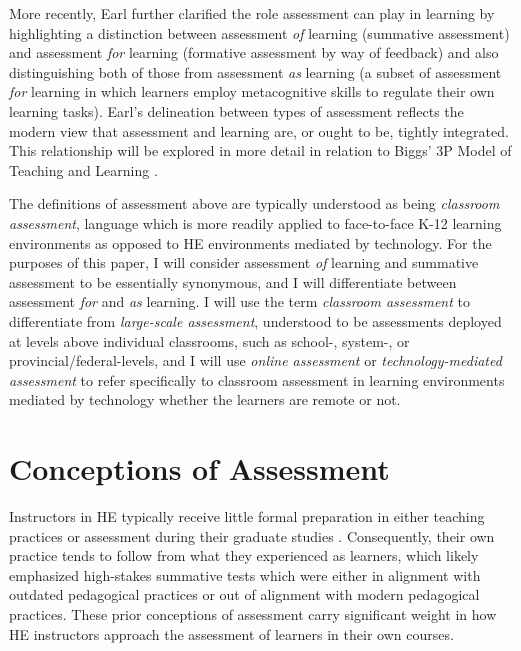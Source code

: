 \documentclass[
]{book}
\begin{document}
More recently, Earl \citeyearpar{earlAssessmentLearningUsing2013} further clarified the role assessment can play in learning by highlighting a distinction between assessment \emph{of} learning (summative assessment) and assessment \emph{for} learning (formative assessment by way of feedback) and also distinguishing both of those from assessment \emph{as} learning (a subset of assessment \emph{for} learning in which learners employ metacognitive skills to regulate their own learning tasks). Earl's delineation between types of assessment reflects the modern view that assessment and learning are, or ought to be, tightly integrated. This relationship will be explored in more detail in relation to Biggs' 3P Model of Teaching and Learning \citetext{\citeyear{biggsEnhancingTeachingConstructive1996}; \citeyear{biggsWhatStudentDoes1999}}.

The definitions of assessment above are typically understood as being \emph{classroom assessment}, language which is more readily applied to face-to-face K-12 learning environments as opposed to HE environments mediated by technology. For the purposes of this paper, I will consider assessment \emph{of} learning and summative assessment to be essentially synonymous, and I will differentiate between assessment \emph{for} and \emph{as} learning. I will use the term \emph{classroom assessment} to differentiate from \emph{large-scale assessment}, understood to be assessments deployed at levels above individual classrooms, such as school-, system-, or provincial/federal-levels, and I will use \emph{online assessment} or \emph{technology-mediated assessment} to refer specifically to classroom assessment in learning environments mediated by technology whether the learners are remote or not.

\hypertarget{conceptions-of-assessment}{%
\section{Conceptions of Assessment}\label{conceptions-of-assessment}}

Instructors in HE typically receive little formal preparation in either teaching practices or assessment during their graduate studies \citep{lipnevichWhatGradesMean2020, masseyAssessmentLiteracyCollege2020}. Consequently, their own practice tends to follow from what they experienced as learners, which likely emphasized high-stakes summative tests which were either in alignment with outdated pedagogical practices or out of alignment with modern pedagogical practices. These prior conceptions of assessment carry significant weight in how HE instructors approach the assessment of learners in their own courses.
\end{document}
